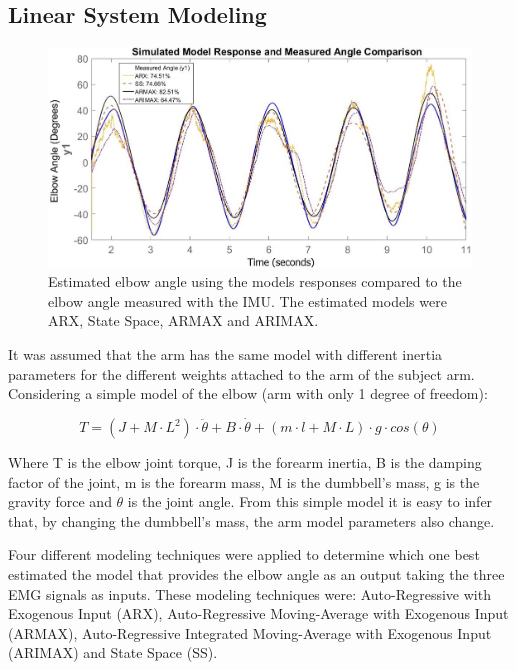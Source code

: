 \subsection{Linear System Modeling}

\begin{figure}[thpb]
      \centering
      \includegraphics[scale=0.5]{Images/Models_comparison_5.jpg}
      \caption{Estimated elbow angle using the models responses compared to the elbow angle measured with the IMU. The estimated models were ARX, State Space, ARMAX and ARIMAX.}
      \label{Models Comparison}
   \end{figure}

It was assumed that the arm has the same model with different inertia parameters for the different weights attached to the arm of the subject arm. Considering a simple model of the elbow (arm with only 1 degree of freedom): 

\begin{equation}\label{eq:simpleModel}
T = (J + M\cdot L^2)\cdot \ddot{\theta}  + B \cdot \dot{\theta}  + (m\cdot l + M \cdot L) \cdot g \cdot cos(\theta)
\end{equation}


Where T is the elbow joint torque, J is the forearm inertia, B is the damping factor of the joint, m is the forearm mass, M is the dumbbell's mass, g is the gravity force and \(\theta\) is the joint angle. From this simple model it is easy to infer that, by changing the dumbbell's mass, the arm model parameters also change.

Four different modeling techniques were applied to determine which one best estimated the model that provides the elbow angle as an output taking the three EMG signals as inputs. These modeling techniques were: Auto-Regressive with Exogenous Input (ARX), Auto-Regressive Moving-Average with Exogenous Input (ARMAX), Auto-Regressive Integrated Moving-Average with Exogenous Input (ARIMAX) and State Space (SS).


